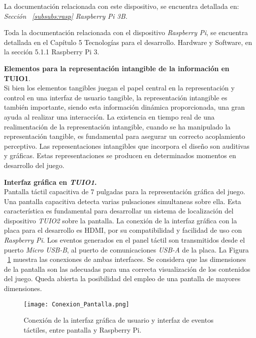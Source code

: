 La documentación relacionada con este dispositivo, se encuentra detallada en: \emph{Sección ~\ref{subsubs:rasp} Raspberry Pi 3B.}

Toda la documentación relacionada con el dispositivo \emph{Raspberry Pi}, se encuentra detallada en el Capítulo 5 Tecnologías para el desarrollo. Hardware y Software, en la sección 5.1.1 Raspberry Pi 3.

\textbf{Elementos para la representación intangible de la información en TUIO1}.\\
Si bien los elementos tangibles juegan el papel central en la representación y control en una interfaz de usuario tangible, la representación intangible es también importante, siendo esta información dinámica proporcionada, una gran ayuda al realizar una interacción. La existencia en tiempo real de una realimentación de la representación intangible, cuando se ha manipulado la representación tangible, es fundamental para asegurar un correcto acoplamiento perceptivo. Las representaciones intangibles que incorpora el diseño son auditivas y gráficas. Estas representaciones se producen en determinados momentos en desarrollo del juego.

\textbf{Interfaz gráfica en \emph{TUIO1}.}\\
Pantalla táctil capacitiva de 7 pulgadas para la representación gráfica del juego. Una pantalla capacitiva detecta varias pulsaciones simultaneas sobre ella. Esta característica es fundamental para desarrollar un sistema de localización del dispositivo \emph{TUIO2} sobre la pantalla.
La conexión de la interfaz gráfica con la placa para el desarrollo es HDMI, por su compatibilidad y facilidad de uso con \emph{Raspberry Pi}. Los eventos generados en el panel táctil son transmitidos desde el puerto \emph{Micro USB-B}, al puerto de comunicaciones \emph{USB-A} de la placa. La Figura ~\ref{fig:Conexion_Pantalla} muestra las conexiones de ambas interfaces.
Se considera que las dimensiones de la pantalla son las adecuadas para una correcta visualización de los contenidos del juego. Queda abierta la posibilidad del empleo de una pantalla de mayores dimensiones.

\begin{figure}[!h]
\begin{center}
\texttt{[image: Conexion\_Pantalla.png]}
\caption{Conexión de la interfaz gráfica de usuario y interfaz de eventos táctiles, entre pantalla y Raspberry Pi.}
\label{fig:Conexion_Pantalla}
\end{center}
\end{figure}


